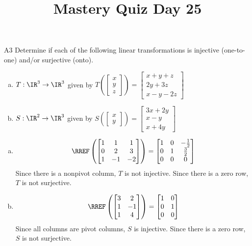 \documentclass{sbgLAquiz}
\title{Mastery Quiz Day 25 }
\begin{document}
\begin{problem}{A3}
Determine if each of the following linear transformations is injective (one-to-one) and/or surjective (onto).
\begin{enumerate}[(a)]
\item $T: \IR^3 \rightarrow \IR^3$ given by $T\left(\begin{bmatrix} x \\ y \\ z  \end{bmatrix} \right) = \begin{bmatrix} x+y+z \\ 2y+3z \\ x-y-2z \end{bmatrix} $
\item $S: \IR^2 \rightarrow \IR^3$ given by $S\left(\begin{bmatrix} x \\ y  \end{bmatrix} \right) = \begin{bmatrix} 3x+2y \\ x-y \\ x+4y \end{bmatrix} $
\end{enumerate}
\end{problem}
\begin{solution}
\begin{enumerate}[(a)]
\item $$\RREF\left( \begin{bmatrix} 1 &  1 & 1 \\ 0  & 2 & 3 \\ 1  & -1 & -2 \end{bmatrix} \right) = \begin{bmatrix} 1 &  0 & -\frac{1}{2} \\ 0  & 1 & \frac{3}{2} \\ 0& 0 & 0  \end{bmatrix}$$
Since there is a nonpivot column, $T$ is not injective.  Since there is a zero row, $T$ is not surjective.
\item $$\RREF \left( \begin{bmatrix} 3 & 2 \\ 1 & -1 \\ 1 & 4 \end{bmatrix} \right) = \begin{bmatrix} 1 & 0 \\ 0 & 1 \\ 0 & 0 \end{bmatrix}$$
Since all columns are pivot columns, $S$ is injective.  Since there is a zero row, $S$ is not surjective.
\end{enumerate}
\end{solution}
\end{document}
